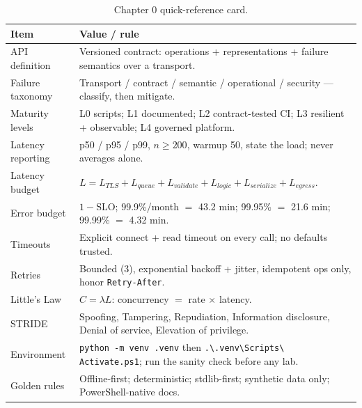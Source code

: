 \begin{table}[h]
  \centering
  \small
  \begin{tabularx}{\textwidth}{l X}
    \toprule
    \textbf{Item} & \textbf{Value / rule} \\
    \midrule
    API definition & Versioned contract: operations + representations +
      failure semantics over a transport. \\
    Failure taxonomy & Transport / contract / semantic / operational /
      security --- classify, then mitigate. \\
    Maturity levels & L0 scripts; L1 documented; L2 contract-tested CI;
      L3 resilient + observable; L4 governed platform. \\
    Latency reporting & p50 / p95 / p99, $n \geq 200$, warmup 50, state the
      load; never averages alone. \\
    Latency budget & $L = L_{TLS} + L_{queue} + L_{validate} + L_{logic} +
      L_{serialize} + L_{egress}$. \\
    Error budget & $1 - \mathrm{SLO}$; 99.9\%/month $=$ 43.2 min;
      99.95\% $=$ 21.6 min; 99.99\% $=$ 4.32 min. \\
    Timeouts & Explicit connect + read timeout on every call; no defaults
      trusted. \\
    Retries & Bounded (3), exponential backoff + jitter, idempotent ops
      only, honor \texttt{Retry-After}. \\
    Little's Law & $C = \lambda L$: concurrency $=$ rate $\times$ latency. \\
    STRIDE & Spoofing, Tampering, Repudiation, Information disclosure,
      Denial of service, Elevation of privilege. \\
    Environment & \texttt{python -m venv .venv} then
      \texttt{.\textbackslash .venv\textbackslash Scripts\textbackslash
      Activate.ps1}; run the sanity check before any lab. \\
    Golden rules & Offline-first; deterministic; stdlib-first; synthetic
      data only; PowerShell-native docs. \\
    \bottomrule
  \end{tabularx}
  \caption{Chapter 0 quick-reference card.}
  \label{tab:ch0-quickref}
\end{table}


